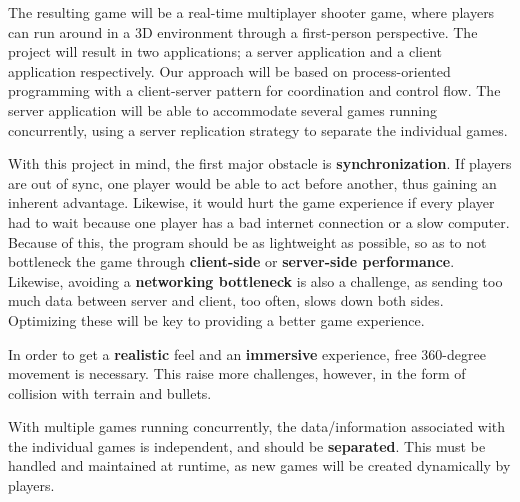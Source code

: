 
The resulting game will be a real-time multiplayer shooter game, where players can run around in a 3D environment through a first-person perspective. The project will result in two applications; a server application and a client application respectively. Our approach will be based on process-oriented programming with a client-server pattern for coordination and control flow. The server application will be able to accommodate several games running concurrently, using a server replication strategy to separate the individual games.

With this project in mind, the first major obstacle is \textbf{synchronization}. If players are out of sync, one player would be able to act before another, thus gaining an inherent advantage. Likewise, it would hurt the game experience if every player had to wait because one player has a bad internet connection or a slow computer. Because of this, the program should be as lightweight as possible, so as to not bottleneck the game through \textbf{client-side} or \textbf{server-side performance}. Likewise, avoiding a \textbf{networking bottleneck} is also a challenge, as sending too much data between server and client, too often, slows down both sides. Optimizing these will be key to providing a better game experience.

In order to get a \textbf{realistic} feel and an \textbf{immersive} experience, free 360-degree movement is necessary. This raise more challenges, however, in the form of collision with terrain and bullets. 

With multiple games running concurrently, the data/information associated with the individual games is independent, and should be \textbf{separated}. This must be handled and maintained at runtime, as new games will be created dynamically by players. 



